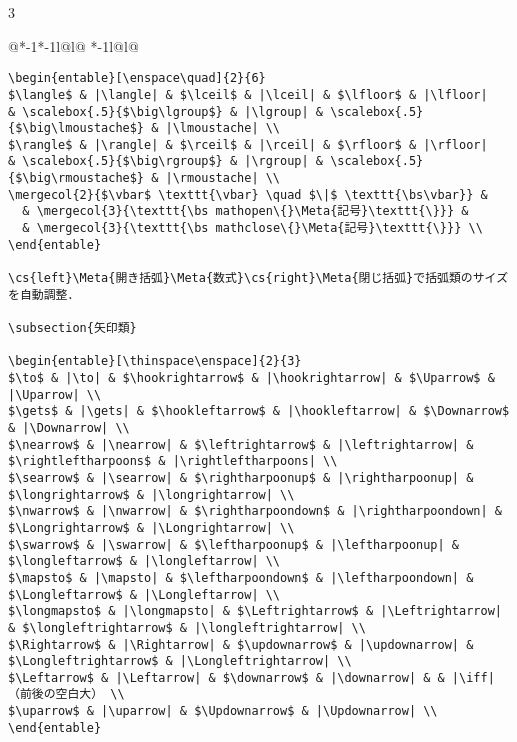 \documentclass[10pt,a4paper,landscape,dvipdfmx,nomag]{jsarticle}
\makeatletter
\def\set@etsep#1#2{\def\etcolsep{#1}\def\etitemsep{#2}}
\newenvironment{entable}[3][\quad\qquad]{%
  \set@etsep#1\relax\relax
  \begin{tabular}{%
    @{}*{\the\numexpr#3-1}{*{\the\numexpr#2-1}{l@{\etcolsep}}l@{\etitemsep}}%
    *{\the\numexpr#2-1}{l@{\etcolsep}}l@{}}}{%
  \end{tabular}}
\newcommand{\mergecol}[2]{\multicolumn{#1}{@{}l@{}}{#2}}
\newcommand*\eghostguarded{%
  \ifmmode \expandafter\@firstofone
  \else \expandafter\pxqgg@eghostguarded@a
  \fi}
\def\pxqgg@eghostguarded@a#1{%
  {\pxqgg@TI\pxqgg@cwm}%
  #1%
  {\pxqgg@TI\pxqgg@cwm}}
\newcommand{\codefont}{\ttfamily\gtfamily}
\newcommand{\cs}[1]{\eghostguarded{{\codefont \bs #1}}}
\newcommand{\Meta}[1]{$\langle$\mbox{}\emph{#1}\mbox{}$\rangle$}
\makeatother
\begin{document}
\begin{multicols}{3}
\begin{entable}[\enspace]{2}{1}
\begin{verbatim}
\begin{entable}[\enspace\quad]{2}{6}
$\langle$ & |\langle| & $\lceil$ & |\lceil| & $\lfloor$ & |\lfloor| 
& \scalebox{.5}{$\big\lgroup$} & |\lgroup| & \scalebox{.5}{$\big\lmoustache$} & |\lmoustache| \\
$\rangle$ & |\rangle| & $\rceil$ & |\rceil| & $\rfloor$ & |\rfloor| 
& \scalebox{.5}{$\big\rgroup$} & |\rgroup| & \scalebox{.5}{$\big\rmoustache$} & |\rmoustache| \\
\mergecol{2}{$\vbar$ \texttt{\vbar} \quad $\|$ \texttt{\bs\vbar}} &
  & \mergecol{3}{\texttt{\bs mathopen\{}\Meta{記号}\texttt{\}}} &
  & \mergecol{3}{\texttt{\bs mathclose\{}\Meta{記号}\texttt{\}}} \\
\end{entable}

\cs{left}\Meta{開き括弧}\Meta{数式}\cs{right}\Meta{閉じ括弧}で括弧類のサイズを自動調整．

\subsection{矢印類}

\begin{entable}[\thinspace\enspace]{2}{3}
$\to$ & |\to| & $\hookrightarrow$ & |\hookrightarrow| & $\Uparrow$ & |\Uparrow| \\
$\gets$ & |\gets| & $\hookleftarrow$ & |\hookleftarrow| & $\Downarrow$ & |\Downarrow| \\
$\nearrow$ & |\nearrow| & $\leftrightarrow$ & |\leftrightarrow| & $\rightleftharpoons$ & |\rightleftharpoons| \\
$\searrow$ & |\searrow| & $\rightharpoonup$ & |\rightharpoonup| & $\longrightarrow$ & |\longrightarrow| \\
$\nwarrow$ & |\nwarrow| & $\rightharpoondown$ & |\rightharpoondown| & $\Longrightarrow$ & |\Longrightarrow| \\
$\swarrow$ & |\swarrow| & $\leftharpoonup$ & |\leftharpoonup| & $\longleftarrow$ & |\longleftarrow| \\
$\mapsto$ & |\mapsto| & $\leftharpoondown$ & |\leftharpoondown| & $\Longleftarrow$ & |\Longleftarrow| \\
$\longmapsto$ & |\longmapsto| & $\Leftrightarrow$ & |\Leftrightarrow| & $\longleftrightarrow$ & |\longleftrightarrow| \\
$\Rightarrow$ & |\Rightarrow| & $\updownarrow$ & |\updownarrow| & $\Longleftrightarrow$ & |\Longleftrightarrow| \\
$\Leftarrow$ & |\Leftarrow| & $\downarrow$ & |\downarrow| & & |\iff|（前後の空白大） \\
$\uparrow$ & |\uparrow| & $\Updownarrow$ & |\Updownarrow| \\
\end{entable}


\end{verbatim}
\end{entable}
\end{multicols}
\end{document}
